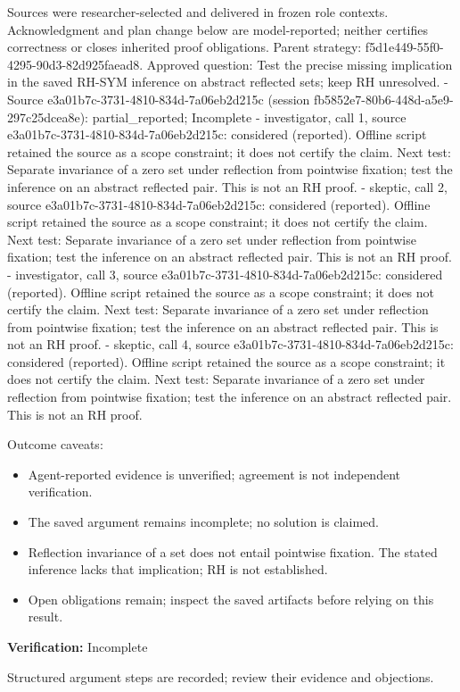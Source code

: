 \documentclass[11pt]{article}
\begin{document}
Sources were researcher-selected and delivered in frozen role contexts. Acknowledgment and plan change below are model-reported; neither certifies correctness or closes inherited proof obligations.
Parent strategy: f5d1e449-55f0-4295-90d3-82d925faead8. Approved question: Test the precise missing implication in the saved RH-SYM inference on abstract reflected sets; keep RH unresolved.
- Source e3a01b7c-3731-4810-834d-7a06eb2d215c (session fb5852e7-80b6-448d-a5e9-297c25dcea8e): partial\_reported; Incomplete
- investigator, call 1, source e3a01b7c-3731-4810-834d-7a06eb2d215c: considered (reported). Offline script retained the source as a scope constraint; it does not certify the claim. Next test: Separate invariance of a zero set under reflection from pointwise fixation; test the inference on an abstract reflected pair. This is not an RH proof.
- skeptic, call 2, source e3a01b7c-3731-4810-834d-7a06eb2d215c: considered (reported). Offline script retained the source as a scope constraint; it does not certify the claim. Next test: Separate invariance of a zero set under reflection from pointwise fixation; test the inference on an abstract reflected pair. This is not an RH proof.
- investigator, call 3, source e3a01b7c-3731-4810-834d-7a06eb2d215c: considered (reported). Offline script retained the source as a scope constraint; it does not certify the claim. Next test: Separate invariance of a zero set under reflection from pointwise fixation; test the inference on an abstract reflected pair. This is not an RH proof.
- skeptic, call 4, source e3a01b7c-3731-4810-834d-7a06eb2d215c: considered (reported). Offline script retained the source as a scope constraint; it does not certify the claim. Next test: Separate invariance of a zero set under reflection from pointwise fixation; test the inference on an abstract reflected pair. This is not an RH proof.\par
Outcome caveats:\par
\begin{itemize}
\item Agent-reported evidence is unverified; agreement is not independent verification.
\item The saved argument remains incomplete; no solution is claimed.
\item Reflection invariance of a set does not entail pointwise fixation. The stated inference lacks that implication; RH is not established.
\item Open obligations remain; inspect the saved artifacts before relying on this result.
\end{itemize}
\textbf{Verification:} Incomplete\par
Structured argument steps are recorded; review their evidence and objections.\par
\end{document}
